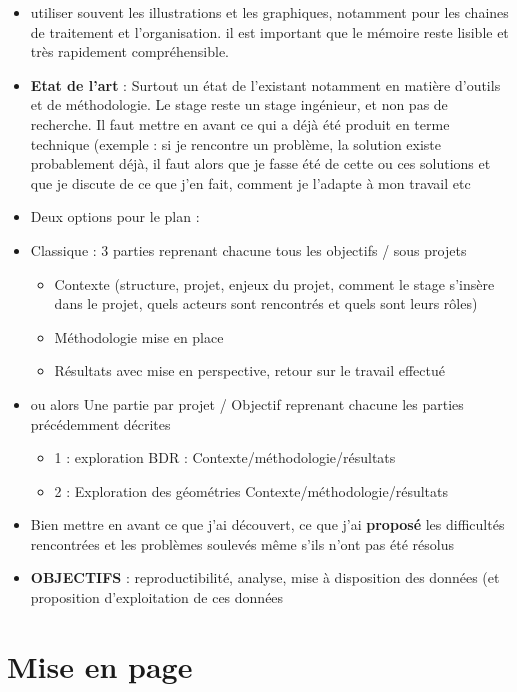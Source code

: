 \documentclass[
  12pt,
  a4paper,
]{scrbook}
\providecommand{\tightlist}{%
  \setlength{\itemsep}{0pt}\setlength{\parskip}{0pt}}\usepackage{longtable,booktabs,array}
\begin{document}
\begin{itemize}
\item
  utiliser souvent les illustrations et les graphiques, notamment pour
  les chaines de traitement et l'organisation. il est important que le
  mémoire reste lisible et très rapidement compréhensible.
\item
  \textbf{Etat de l'art} : Surtout un état de l'existant notamment en
  matière d'outils et de méthodologie. Le stage reste un stage
  ingénieur, et non pas de recherche. Il faut mettre en avant ce qui a
  déjà été produit en terme technique (exemple : si je rencontre un
  problème, la solution existe probablement déjà, il faut alors que je
  fasse été de cette ou ces solutions et que je discute de ce que j'en
  fait, comment je l'adapte à mon travail etc
\item
  Deux options pour le plan :
\item
  Classique : 3 parties reprenant chacune tous les objectifs / sous
  projets

  \begin{itemize}
  \tightlist
  \item
    Contexte (structure, projet, enjeux du projet, comment le stage
    s'insère dans le projet, quels acteurs sont rencontrés et quels sont
    leurs rôles)
  \item
    Méthodologie mise en place
  \item
    Résultats avec mise en perspective, retour sur le travail effectué
  \end{itemize}
\item
  ou alors Une partie par projet / Objectif reprenant chacune les
  parties précédemment décrites

  \begin{itemize}
  \tightlist
  \item
    1 : exploration BDR : Contexte/méthodologie/résultats
  \item
    2 : Exploration des géométries Contexte/méthodologie/résultats
  \end{itemize}
\item
  Bien mettre en avant ce que j'ai découvert, ce que j'ai
  \textbf{proposé} les difficultés rencontrées et les problèmes soulevés
  même s'ils n'ont pas été résolus
\item
  \textbf{OBJECTIFS} : reproductibilité, analyse, mise à disposition des
  données (et proposition d'exploitation de ces données
\end{itemize}

\hypertarget{mise-en-page}{%
\section*{Mise en page}\label{mise-en-page}}
\end{document}
